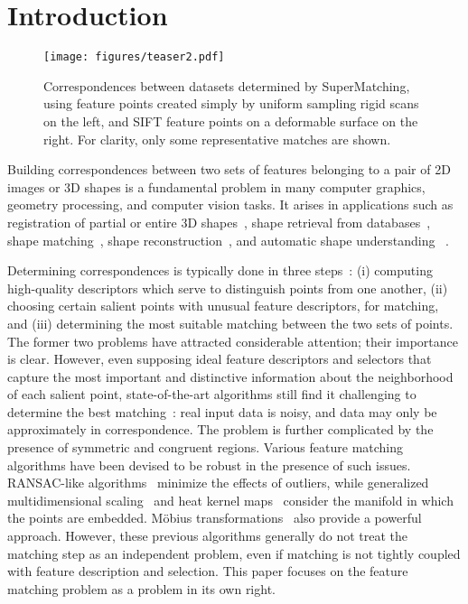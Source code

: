 \section{Introduction}
\label{sec:introduction}

\begin{figure*}[t!]
\centering
  \texttt{[image: figures/teaser2.pdf]}
  \caption{Correspondences between datasets determined by SuperMatching, using feature points created simply by uniform sampling rigid scans on the left, and SIFT feature points on a deformable surface on the right. For clarity, only some representative matches are shown.}
\label{fig:teaser}
\end{figure*}

Building correspondences between two sets of features belonging to a pair of 2D images or 3D shapes
is a fundamental problem in many computer graphics, geometry processing, and computer vision tasks.
It arises in applications such as
registration of partial or entire 3D shapes~\cite{Besl92,Gelfand05,Aiger08,li08,Chang09,Zeng10,vanKaick11,Chang11},
shape retrieval from databases~\cite{Bronstein11},
shape matching~\cite{Berg05,Brown07,Lorenzo08,Tevs09,Ovsjanikov10,Tevs11,SahilliogluY11,Windheuser11},
shape reconstruction~\cite{Brown07,Pekelny08,Wand09,Chang11},
and automatic shape understanding~\cite{Huttenlocher90,Lipman09,Sun10,Kim11} .

Determining correspondences is typically done in three steps~\cite{Johnson99,Lowe04,Sun09,Toler10,Leutenegger11}:
(i) computing high-quality descriptors which serve to distinguish points from one another,
(ii) choosing certain salient points with unusual feature descriptors, for matching,
and (iii) determining the most suitable matching between the two sets of points.
The former two problems have attracted considerable attention; their importance is clear.
However, even supposing ideal feature descriptors and selectors that capture the most important and distinctive information about the neighborhood of each salient point,
state-of-the-art algorithms  still find it challenging to determine the best matching~\cite{vanKaick11}:  real input data is noisy, and data may only be approximately in correspondence.
The problem is further complicated by the presence of symmetric and congruent regions.
Various feature matching algorithms have been devised to be robust in the presence of such issues. RANSAC-like algorithms~\cite{Tevs09,Tevs11} minimize the effects of outliers,
while generalized multidimensional scaling~\cite{Bronstein11} and
heat kernel maps~\cite{Ovsjanikov10}  consider the manifold in which the points are embedded. M{\"o}bius transformations~\cite{Lipman09,Kim11} also provide a powerful approach.
However, these previous algorithms generally do not treat the matching step as an independent problem, even if matching is not tightly coupled with feature description and selection.
This paper focuses on the feature matching problem as a problem in its own right.

